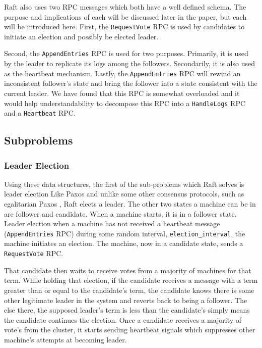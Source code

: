 Raft also uses two RPC messages which both have a well defined schema.
The purpose and implications of each will be discussed later in the paper, but each will be introduced here.
First, the \texttt{RequestVote} RPC is used by candidates to initiate an election and possibly be elected leader.

Second, the \texttt{AppendEntries} RPC is used for two purposes.
Primarily, it is used by the leader to replicate its logs among the followers.
Secondarily, it is also used as the heartbeat mechanism.
Lastly, the \texttt{AppendEntries} RPC will rewind an inconsistent follower's state and bring the follower into a state consistent with the current leader.
We have found that this RPC is somewhat overloaded and it would help understandability to decompose this RPC into a \texttt{HandleLogs} RPC and a \texttt{Heartbeat} RPC.

\subsection{Subproblems}

\subsubsection{Leader Election}

Using these data structures, the first of the sub-problems which Raft solves is leader election
Like Paxos and unlike some other consensus protocols, such as egalitarian Paxos \cite{e-paxos}, Raft elects a leader.
The other two states a machine can be in are follower and candidate.
When a machine starts, it is in a follower state.
Leader election when a machine has not received a heartbeat message (\texttt{AppendEntries} RPC) during some random interval, \texttt{election\_interval}, the machine initiates an election.
The machine, now in a candidate state, sends a \texttt{RequestVote} RPC.

That candidate then waits to receive votes from a majority of machines for that term.
While holding that election, if the candidate receives a message with a term greater than or equal to the candidate's term, the candidate knows there is some other legitimate leader in the system and reverts back to being a follower.
The else there, the supposed leader's term is less than the candidate's simply means the candidate continues the election.
Once a candidate receives a majority of vote's from the cluster, it starts sending heartbeat signals which suppresses other machine's attempts at becoming leader.

